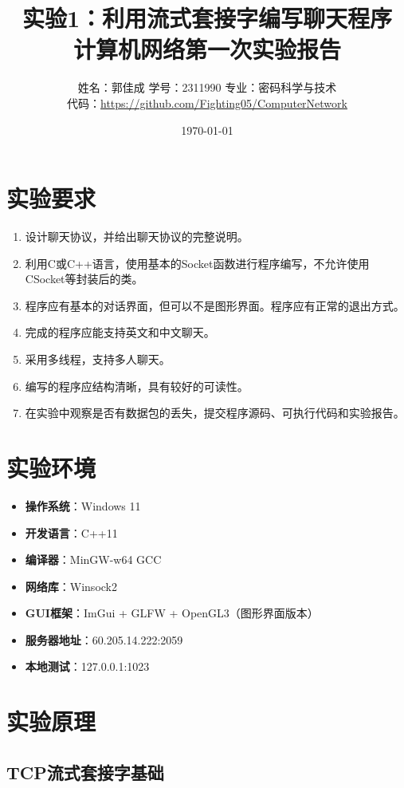 \documentclass[12pt, a4paper]{article}
\title{\textbf{\LARGE 实验1：利用流式套接字编写聊天程序\\计算机网络第一次实验报告}}
\author{姓名：郭佳成 \quad 学号：2311990 \quad 专业：密码科学与技术 \\ \quad 代码：\url{https://github.com/Fighting05/ComputerNetwork}}
\date{\today}
\begin{document}
\maketitle

\section{实验要求}

\begin{enumerate}[itemsep=5pt]
  \item 设计聊天协议，并给出聊天协议的完整说明。
  \item 利用C或C++语言，使用基本的Socket函数进行程序编写，不允许使用CSocket等封装后的类。
  \item 程序应有基本的对话界面，但可以不是图形界面。程序应有正常的退出方式。
  \item 完成的程序应能支持英文和中文聊天。
  \item 采用多线程，支持多人聊天。
  \item 编写的程序应结构清晰，具有较好的可读性。
  \item 在实验中观察是否有数据包的丢失，提交程序源码、可执行代码和实验报告。
\end{enumerate}

\section{实验环境}

\begin{itemize}[itemsep=3pt]
  \item \textbf{操作系统}：Windows 11
  \item \textbf{开发语言}：C++11
  \item \textbf{编译器}：MinGW-w64 GCC
  \item \textbf{网络库}：Winsock2
  \item \textbf{GUI框架}：ImGui + GLFW + OpenGL3（图形界面版本）
  \item \textbf{服务器地址}：60.205.14.222:2059
  \item \textbf{本地测试}：127.0.0.1:1023
\end{itemize}

\section{实验原理}

\subsection{TCP流式套接字基础}
\end{document}
